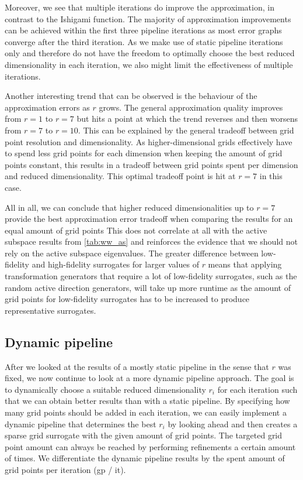 \documentclass[
  a4paper,  %
  twoside,  %
  bibliography=totoc,
  headsepline,
  cleardoublepage=empty,
  parskip=half,
  draft=false
]{scrbook}
\begin{document}
Moreover, we see that multiple iterations do improve the approximation, in contrast to the Ishigami function.
The majority of approximation improvements can be achieved within the first three pipeline iterations as most error graphs converge after the third iteration.
As we make use of static pipeline iterations only and therefore do not have the freedom to optimally choose the best reduced dimensionality in each iteration, we also might limit the effectiveness of multiple iterations.

Another interesting trend that can be observed is the behaviour of the approximation errors as $r$ grows.
The general approximation quality improves from $r=1$ to $r=7$ but hits a point at which the trend reverses and then worsens from $r=7$ to $r=10$.
This can be explained by the general tradeoff between grid point resolution and dimensionality.
As higher-dimensional grids effectively have to spend less grid points for each dimension when keeping the amount of grid points constant, this results in a tradeoff between grid points spent per dimension and reduced dimensionality.
This optimal tradeoff point is hit at $r=7$ in this case.

All in all, we can conclude that higher reduced dimensionalities up to $r=7$ provide the best approximation error tradeoff when comparing the results for an equal amount of grid points
This does not correlate at all with the active subspace results from \cref{tab:ww_as} and reinforces the evidence that we should not rely on the active subspace eigenvalues.
The greater difference between low-fidelity and high-fidelity surrogates for larger values of $r$ means that applying transformation generators that require a lot of low-fidelity surrogates, such as the random active direction generators, will take up more runtime as the amount of grid points for low-fidelity surrogates has to be increased to produce representative surrogates.

\newpage
\subsection{Dynamic pipeline}

After we looked at the results of a mostly static pipeline in the sense that $r$ was fixed, we now continue to look at a more dynamic pipeline approach.
The goal is to dynamically choose a suitable reduced dimensionality $r_i$ for each iteration such that we can obtain better results than with a static pipeline.
By specifying how many grid points should be added in each iteration, we can easily implement a dynamic pipeline that determines the best $r_i$ by looking ahead and then creates a sparse grid surrogate with the given amount of grid points.
The targeted grid point amount can always be reached by performing refinements a certain amount of times.
We differentiate the dynamic pipeline results by the spent amount of grid points per iteration (gp / it).
\end{document}
